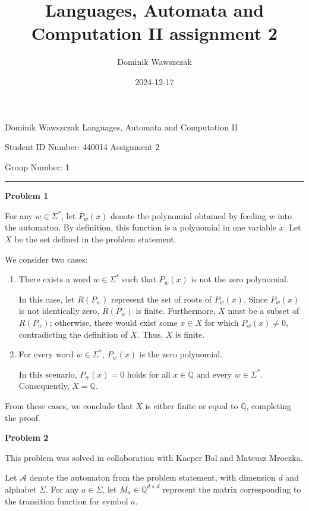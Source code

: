 \documentclass[12pt]{article}
\title{Languages, Automata and Computation II assignment 2}
\author{Dominik Wawszczak}
\date{2024-12-17}
\begin{document}
	\setlength{\parindent}{0 cm}
	
	Dominik Wawszczak \hfill Languages, Automata and Computation II
	
	Student ID Number: 440014 \hfill Assignment 2
	
	Group Number: 1
	
	\bigskip
	\hrule
	\bigskip
	
	\textbf{Problem 1}
	
	\medskip
	
	For any \(w \in \Sigma^{\ast}\), let \(P_{w}(x)\) denote the polynomial
	obtained by feeding \(w\) into the automaton. By definition, this function
	is a polynomial in one variable \(x\). Let \(X\) be the set defined in the
	problem statement.
	
	\medskip
	
	We consider two cases:
	\begin{enumerate}
		\item There exists a word \(w \in \Sigma^{\ast}\) such that \(P_{w}(x)\)
		      is not the zero polynomial.
		      
		      In this case, let \(R(P_{w})\) represent the set of roots of
		      \(P_{w}(x)\). Since \(P_{w}(x)\) is not identically zero,
		      \(R(P_{w})\) is finite. Furthermore, \(X\) must be a subset of
		      \(R(P_{w})\); otherwise, there would exist some \(x \in X\) for
		      which \(P_{w}(x) \neq 0\), contradicting the definition of \(X\).
		      Thus, \(X\) is finite.
		
		\item For every word \(w \in \Sigma^{\ast}\), \(P_{w}(x)\) is the zero
		      polynomial.
		      
		      In this scenario, \(P_{w}(x) = 0\) holds for all \(x \in
		      \mathbb{Q}\) and every \(w \in \Sigma^{\ast}\). Consequently, \(X
		      = \mathbb{Q}\).
	\end{enumerate}
	From these cases, we conclude that \(X\) is either finite or equal to
	\(\mathbb{Q}\), completing the proof.
	
	\bigskip
	
	\textbf{Problem 2}
	
	\medskip
	
	This problem was solved in collaboration with Kacper Bal and Mateusz
	Mroczka.
	
	\medskip
	
	Let \(\mathcal{A}\) denote the automaton from the problem statement, with
	dimension \(d\) and alphabet \(\Sigma\). For any \(a \in \Sigma\), let
	\(M_{a} \in \mathbb{Q}^{d \times d}\) represent the matrix corresponding to
	the transition function for symbol \(a\).
	
\end{document}
